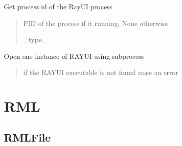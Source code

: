 \documentclass[letterpaper,10pt,english]{sphinxmanual}
\begin{document}
\begin{fulllineitems}
\begin{fulllineitems}
\label{\detokenize{code_documentation:raypyng.runner.RayUIRunner.pid}}
\pysigstartsignatures
{}
\pysigstopsignatures
\sphinxAtStartPar
Get process id of the RayUI process
\begin{quote}\begin{description}
\sphinxAtStartPar
PID of the process if it running, None otherwise

\sphinxAtStartPar
\_type\_

\end{description}\end{quote}

\end{fulllineitems}


\begin{fulllineitems}
\label{\detokenize{code_documentation:raypyng.runner.RayUIRunner.run}}
\pysigstartsignatures
{}
\pysigstopsignatures
\sphinxAtStartPar
Open one instance of RAY\sphinxhyphen{}UI using subprocess
\begin{quote}\begin{description}
\sphinxAtStartPar
{} \textendash{} if the RAY\sphinxhyphen{}UI executable is not found raise an error

\end{description}\end{quote}

\end{fulllineitems}


\end{fulllineitems}



\chapter{RML}
\label{\detokenize{code_documentation:rml}}

\section{RMLFile}
\label{\detokenize{code_documentation:rmlfile}}
\end{document}
